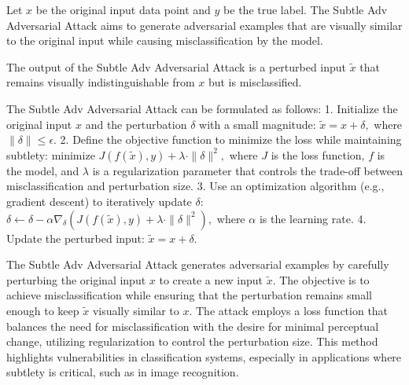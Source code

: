 Let \( x \) be the original input data point and \( y \) be the true label. The Subtle Adv Adversarial Attack aims to generate adversarial examples that are visually similar to the original input while causing misclassification by the model.

The output of the Subtle Adv Adversarial Attack is a perturbed input \( \tilde{x} \) that remains visually indistinguishable from \( x \) but is misclassified.

The Subtle Adv Adversarial Attack can be formulated as follows:
1. Initialize the original input \( x \) and the perturbation \( \delta \) with a small magnitude:
   $
   \tilde{x} = x + \delta,
   $
   where \( \|\delta\| \leq \epsilon \).
2. Define the objective function to minimize the loss while maintaining subtlety:
   $
   \text{minimize } J(f(\tilde{x}), y) + \lambda \cdot \|\delta\|^2,
   $
   where \( J \) is the loss function, \( f \) is the model, and \( \lambda \) is a regularization parameter that controls the trade-off between misclassification and perturbation size.
3. Use an optimization algorithm (e.g., gradient descent) to iteratively update \( \delta \):
   $
   \delta \leftarrow \delta - \alpha \nabla_{\delta} \left(J(f(\tilde{x}), y) + \lambda \cdot \|\delta\|^2\right),
   $
   where \( \alpha \) is the learning rate.
4. Update the perturbed input:
   $
   \tilde{x} = x + \delta.
   $

The Subtle Adv Adversarial Attack generates adversarial examples by carefully perturbing the original input \( x \) to create a new input \( \tilde{x} \). The objective is to achieve misclassification while ensuring that the perturbation remains small enough to keep \( \tilde{x} \) visually similar to \( x \). The attack employs a loss function that balances the need for misclassification with the desire for minimal perceptual change, utilizing regularization to control the perturbation size. This method highlights vulnerabilities in classification systems, especially in applications where subtlety is critical, such as in image recognition.
